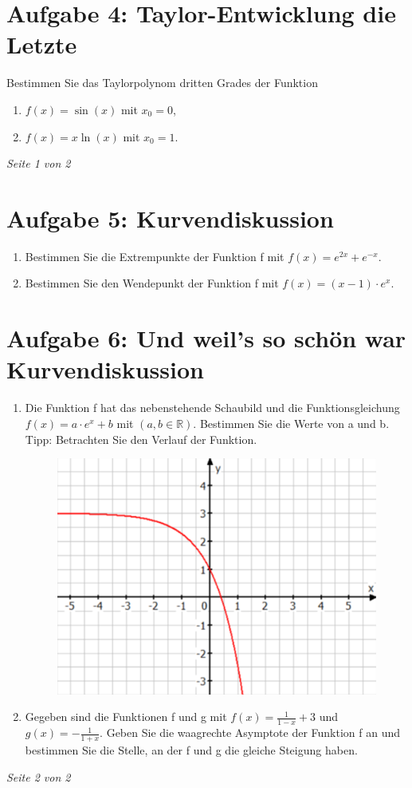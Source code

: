 \documentclass[11pt,a4paper, parskip=half ]{report}
\begin{document}
  \section*{Aufgabe 4:  Taylor-Entwicklung die Letzte}
  Bestimmen Sie das Taylorpolynom dritten Grades der Funktion \begin{enumerate}
    \item $f(x) = \sin(x)$ mit $x_0 = 0$,
    \item $f(x) = x \ln(x)$ mit $x_0 = 1$. 
  \end{enumerate}

\vfill
\begin{flushright}\textit{Seite 1 von 2}\end{flushright}\newpage


\section*{Aufgabe 5: Kurvendiskussion}
\begin{enumerate}
  \item Bestimmen Sie die Extrempunkte der Funktion f mit $f(x) = e^{2x} + e^{-x}$.
  \item Bestimmen Sie den Wendepunkt der Funktion f mit $f(x) = (x-1)\cdot e^x$.
\end{enumerate}

\section*{Aufgabe 6: Und weil's so schön war Kurvendiskussion}
\begin{enumerate}
  \item Die Funktion f  hat das nebenstehende Schaubild und die	Funktionsgleichung $f(x) = a\cdot e^x + b$ mit $(a,b \in \mathbb{R})$. Bestimmen Sie die Werte von a und b. Tipp: Betrachten Sie den Verlauf der Funktion.
  \begin{figure}
    \includegraphics{media/Bild1.png}
  \end{figure}
  \item Gegeben sind die Funktionen f und g mit $f(x) = \frac{1}{1-x}+3$ und $g(x)=-\frac{1}{1+x}$.	Geben Sie die waagrechte Asymptote der Funktion f an und bestimmen Sie die Stelle, an der f und g  die gleiche Steigung haben.
\end{enumerate}


\vfill
\begin{flushright}\textit{Seite 2 von 2}\end{flushright}%
\end{document}
